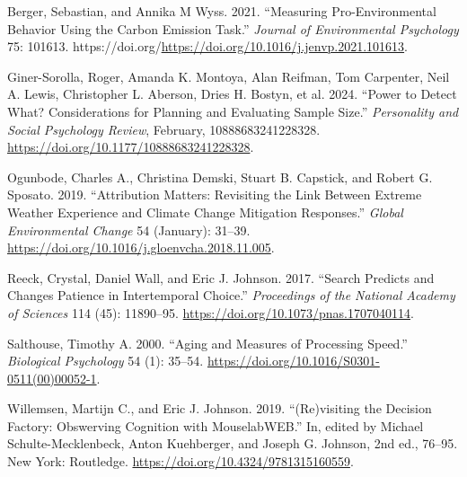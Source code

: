 \documentclass[
  letterpaper,
  DIV=11,
  numbers=noendperiod]{scrartcl}
\newlength{\cslhangindent}
\newenvironment{CSLReferences}[2] %
 {\begin{list}{}{%
  \setlength{\itemindent}{0pt}
  \setlength{\leftmargin}{0pt}
  \setlength{\parsep}{0pt}
  \ifodd #1
   \setlength{\leftmargin}{\cslhangindent}
   \setlength{\itemindent}{-1\cslhangindent}
  \fi
  \setlength{\itemsep}{#2\baselineskip}}}
 {\end{list}}
\begin{document}
\label{refs}
\begin{CSLReferences}{1}{0}
Berger, Sebastian, and Annika M Wyss. 2021. {``Measuring
Pro-Environmental Behavior Using the Carbon Emission Task.''}
\emph{Journal of Environmental Psychology} 75: 101613.
https://doi.org/\url{https://doi.org/10.1016/j.jenvp.2021.101613}.

Giner-Sorolla, Roger, Amanda K. Montoya, Alan Reifman, Tom Carpenter,
Neil A. Lewis, Christopher L. Aberson, Dries H. Bostyn, et al. 2024.
{``Power to Detect What? Considerations for Planning and Evaluating
Sample Size.''} \emph{Personality and Social Psychology Review},
February, 10888683241228328.
\url{https://doi.org/10.1177/10888683241228328}.

Ogunbode, Charles A., Christina Demski, Stuart B. Capstick, and Robert
G. Sposato. 2019. {``Attribution Matters: Revisiting the Link Between
Extreme Weather Experience and Climate Change Mitigation Responses.''}
\emph{Global Environmental Change} 54 (January): 31--39.
\url{https://doi.org/10.1016/j.gloenvcha.2018.11.005}.

Reeck, Crystal, Daniel Wall, and Eric J. Johnson. 2017. {``Search
Predicts and Changes Patience in Intertemporal Choice.''}
\emph{Proceedings of the National Academy of Sciences} 114 (45):
11890--95. \url{https://doi.org/10.1073/pnas.1707040114}.

Salthouse, Timothy A. 2000. {``Aging and Measures of Processing
Speed.''} \emph{Biological Psychology} 54 (1): 35--54.
\url{https://doi.org/10.1016/S0301-0511(00)00052-1}.

Willemsen, Martijn C., and Eric J. Johnson. 2019. {``(Re)visiting the
Decision Factory: Obswerving Cognition with MouselabWEB.''} In, edited
by Michael Schulte-Mecklenbeck, Anton Kuehberger, and Joseph G. Johnson,
2nd ed., 76--95. New York: Routledge.
\url{https://doi.org/10.4324/9781315160559}.

\end{CSLReferences}
\end{document}
